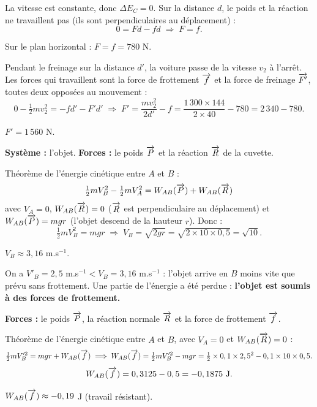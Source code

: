 La vitesse est constante, donc $\Delta E_C = 0$. Sur la distance $d$, le poids et la réaction ne
travaillent pas (ils sont perpendiculaires au déplacement) :
\[
0 = F d - f d \;\Longrightarrow\; F = f.
\]
\begin{resultat}
Sur le plan horizontal : $F = f = 780$ N.
\end{resultat}

Pendant le freinage sur la distance $d'$, la voiture passe de la vitesse $v_2$ à l'arrêt. Les forces
qui travaillent sont la force de frottement $\overrightarrow{f}$ et la force de freinage $\overrightarrow{F'}$, toutes deux
opposées au mouvement :
\[
0 - \tfrac{1}{2} m v_2^2 = - f d' - F' d'
\;\Longrightarrow\;
F' = \frac{m v_2^2}{2 d'} - f = \frac{1\,300 \times 144}{2 \times 40} - 780 = 2\,340 - 780.
\]
\begin{resultat}
$F' = 1\,560$ N.
\end{resultat}


\textbf{Système :} l'objet. \textbf{Forces :} le poids $\overrightarrow{P}$ et la réaction $\overrightarrow{R}$ de la cuvette.

Théorème de l'énergie cinétique entre $A$ et $B$ :
\[
\tfrac{1}{2} m V_B^2 - \tfrac{1}{2} m V_A^2 = W_{AB}(\overrightarrow{P}) + W_{AB}(\overrightarrow{R})
\]
avec $V_A = 0$, $W_{AB}(\overrightarrow{R}) = 0$ ($\overrightarrow{R}$ est perpendiculaire au déplacement) et
$W_{AB}(\overrightarrow{P}) = m g r$ (l'objet descend de la hauteur $r$). Donc :
\[
\tfrac{1}{2} m V_B^2 = m g r \;\Longrightarrow\; V_B = \sqrt{2 g r} = \sqrt{2 \times 10 \times 0,5} = \sqrt{10}.
\]
\begin{resultat}
$V_B \approx 3,16$ m.s$^{-1}$.
\end{resultat}

On a $V'_B = 2,5$ m.s$^{-1} < V_B = 3,16$ m.s$^{-1}$ : l'objet arrive en $B$ moins vite que prévu
sans frottement. Une partie de l'énergie a été perdue : \textbf{l'objet est soumis à des forces de
frottement.}

\textbf{Forces :} le poids $\overrightarrow{P}$, la réaction normale $\overrightarrow{R}$ et la force de frottement $\overrightarrow{f}$.

Théorème de l'énergie cinétique entre $A$ et $B$, avec $V_A = 0$ et $W_{AB}(\overrightarrow{R}) = 0$ :
\[
\tfrac{1}{2} m V_B'^2 = m g r + W_{AB}(\overrightarrow{f})
\;\Longrightarrow\;
W_{AB}(\overrightarrow{f}) = \tfrac{1}{2} m V_B'^2 - m g r
= \tfrac{1}{2} \times 0,1 \times 2,5^2 - 0,1 \times 10 \times 0,5.
\]
\[
W_{AB}(\overrightarrow{f}) = 0,3125 - 0,5 = -0,1875 \text{ J.}
\]
\begin{resultat}
$W_{AB}(\overrightarrow{f}) \approx -0,19$ J (travail résistant).
\end{resultat}

